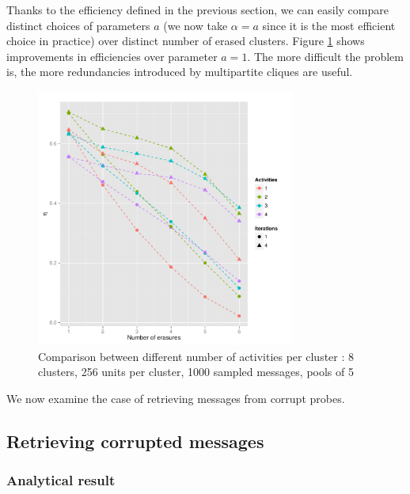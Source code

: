 \documentclass[english,10pt,twocolumn]{IEEEtran}
\theoremstyle{definition}
\begin{document}
		Thanks to the efficiency defined in the previous section, we can easily compare distinct choices of parameters $a$ (we now take $\alpha = a$ since it is the most efficient choice in practice) over distinct number of erased clusters. Figure \ref{comperth} shows improvements in efficiencies over parameter $a =1$. The more difficult the problem is, the more redundancies introduced by multipartite cliques are useful.
		
		\begin{figure}[!htb]
		\includegraphics[width=8.5cm]{Courbes/5portant_erasures_c8l256}
		\caption{Comparison between different number of activities per cluster :  8 clusters, 256 units per cluster, 1000 sampled messages, pools of 5}
		\label{comperth}
	\end{figure}
%	
	
	
	We now examine the case of retrieving messages from corrupt probes.
	
	\subsection{Retrieving corrupted messages}
	
	\subsubsection{Analytical result}
%	
%	
%	
%	
%	
	
\end{document}
